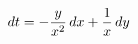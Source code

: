 \documentclass[preview]{standalone}
\begin{document}
\begin{align*}
\special{dvisvgm:raw <g id='unique000'>}dt = -\frac{y}{x^2} \, dx + \frac{1}{x} \, dy\special{dvisvgm:raw </g>}
\end{align*}
\end{document}
